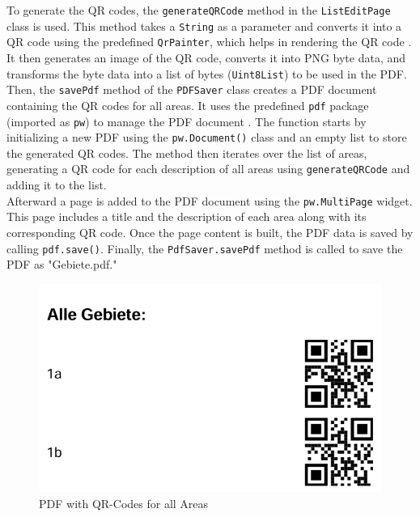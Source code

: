 To generate the QR codes, the \texttt{generateQRCode} method in the \texttt{ListEditPage} class is used. This method takes a \texttt{String} as a parameter and converts it into a QR code using the predefined \texttt{QrPainter}, which helps in rendering the QR code \autocite{pub.dev/QrPainter-class}. It then generates an image of the QR code, converts it into PNG byte data, and transforms the byte data into a list of bytes (\texttt{Uint8List}) to be used in the PDF. \\

Then, the \texttt{savePdf} method of the \texttt{PDFSaver} class creates a PDF document containing the QR codes for all areas. It uses the predefined \texttt{pdf} package (imported as \texttt{pw}) to manage the PDF document \autocite{pub.dev/pdf}. The function starts by initializing a new PDF using the \texttt{pw.Document()} class and an empty list to store the generated QR codes. The method then iterates over the list of areas, generating a QR code for each description of all areas using \texttt{generateQRCode} and adding it to the list.\\

Afterward a page is added to the PDF document using the \texttt{pw.MultiPage} widget. This page includes a title and the description of each area along with its corresponding QR code. Once the page content is built, the PDF data is saved by calling \texttt{pdf.save()}. Finally, the \texttt{PdfSaver.savePdf} method is called to save the PDF as "Gebiete.pdf."

\begin{figure}[H]
    \centering
    \includegraphics[width=0.5\linewidth]{images/AdminPanel/GebietePDF.png}
    \caption{PDF with QR-Codes for all Areas}
\end{figure}


